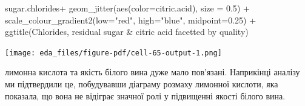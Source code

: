 \documentclass[
  letterpaper,
  DIV=11,
  numbers=noendperiod]{scrreprt}
\newenvironment{Shaded}{\begin{snugshade}}{\end{snugshade}}
\newcommand{\AttributeTok}[1]{\textcolor[rgb]{0.40,0.45,0.13}{#1}}
\newcommand{\DecValTok}[1]{\textcolor[rgb]{0.68,0.00,0.00}{#1}}
\newcommand{\FloatTok}[1]{\textcolor[rgb]{0.68,0.00,0.00}{#1}}
\newcommand{\FunctionTok}[1]{\textcolor[rgb]{0.28,0.35,0.67}{#1}}
\newcommand{\NormalTok}[1]{\textcolor[rgb]{0.00,0.23,0.31}{#1}}
\newcommand{\SpecialCharTok}[1]{\textcolor[rgb]{0.37,0.37,0.37}{#1}}
\newcommand{\StringTok}[1]{\textcolor[rgb]{0.13,0.47,0.30}{#1}}
\begin{document}
\begin{Shaded}
\begin{Highlighting}[]
\NormalTok{sugar.chlorides}\SpecialCharTok{+}
  \FunctionTok{geom\_jitter}\NormalTok{(}\FunctionTok{aes}\NormalTok{(}\AttributeTok{color=}\NormalTok{citric.acid), }\AttributeTok{size =} \FloatTok{0.5}\NormalTok{) }\SpecialCharTok{+}
  \FunctionTok{scale\_colour\_gradient2}\NormalTok{(}\AttributeTok{low=}\StringTok{"red"}\NormalTok{, }\AttributeTok{high=}\StringTok{"blue"}\NormalTok{, }\AttributeTok{midpoint=}\FloatTok{0.25}\NormalTok{) }\SpecialCharTok{+}
  \FunctionTok{ggtitle}\NormalTok{(}\StringTok{\textquotesingle{}Chlorides, residual sugar \& citric acid facetted by quality\textquotesingle{}}\NormalTok{)}
\end{Highlighting}
\end{Shaded}

\texttt{[image: eda\_files/figure-pdf/cell-65-output-1.png]}

лимонна кислота та якість білого вина дуже мало пов'язані. Наприкінці
аналізу ми підтвердили це, побудувавши діаграму розмаху лимонної
кислоти, яка показала, що вона не відіграє значної ролі у підвищенні
якості білого вина.

\begin{Shaded}
\end{Shaded}
\end{document}
